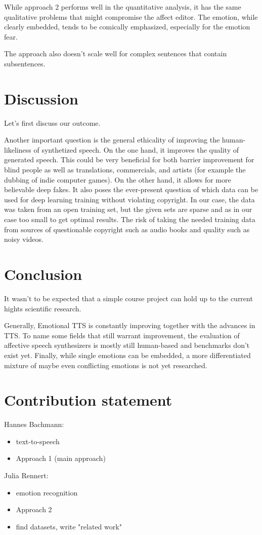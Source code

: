 \documentclass[11pt]{article}
\begin{document}

While approach 2 performs well in the quantitative analysis, it has the same qualitative problems that might compromise the affect editor. The emotion, while clearly embedded, tends to be comically emphasized, especially for the emotion fear.

The approach also doesn't scale well for complex sentences that contain subsentences.
\section{Discussion}
\label{discussion}
Let's first discuss our outcome.

Another important question is the general ethicality of improving the human-likeliness of synthetized speech. On the one hand, it improves the quality of generated speech. This could be very beneficial for both barrier improvement for blind people as well as translations, commercials, and artists (for example the dubbing of indie computer games). On the other hand, it allows for more believable deep fakes. It also poses the ever-present question of which data can be used for deep learning training without violating copyright. In our case, the data was taken from an open training set, but the given sets are sparse and as in our case too small to get optimal results\cite{he_improve_2022}. The risk of taking the needed training data from sources of questionable copyright such as audio books and quality such as noisy videos.

\section{Conclusion}
\label{conclusion}
It wasn't to be expected that a simple course project can hold up to the current hights scientific research.

Generally, Emotional TTS is constantly improving together with the advances in TTS. To name some fields that still warrant improvement, the evaluation of affective speech synthesizers is mostly still human-based and benchmarks don't exist yet. Finally, while single emotions can be embedded, a more differentiated mixture of maybe even conflicting emotions is not yet researched.

\section{Contribution statement}
Hannes Bachmann:
\begin{itemize}
\item text-to-speech
\item Approach 1 (main approach)
\end{itemize}
Julia Rennert:
\begin{itemize}
\item emotion recognition
\item Approach 2
\item find datasets, write "related work"
\end{itemize}
\end{document}
